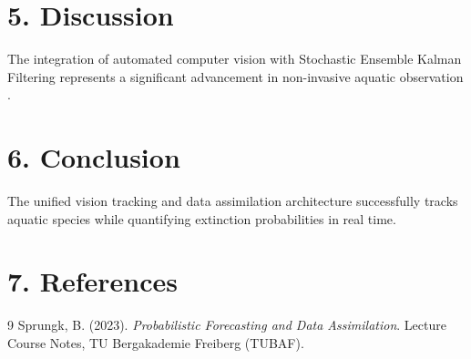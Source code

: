 \documentclass[11pt,a4paper]{article}
\begin{document}
\vspace{0.4cm}


\section*{5. Discussion}
The integration of automated computer vision with Stochastic Ensemble Kalman Filtering represents a significant advancement in non-invasive aquatic observation \cite{sprungk2023}.

\section*{6. Conclusion}
The unified vision tracking and data assimilation architecture successfully tracks aquatic species while quantifying extinction probabilities in real time.

\section*{7. References}
\begin{thebibliography}{9}
     Sprungk, B. (2023). \textit{Probabilistic Forecasting and Data Assimilation}. Lecture Course Notes, TU Bergakademie Freiberg (TUBAF).
\end{thebibliography}
\end{document}
